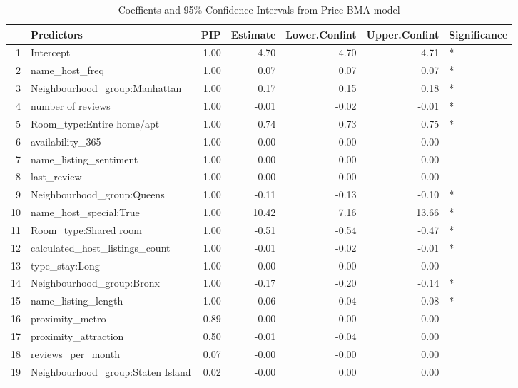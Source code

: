 \documentclass[10pt]{jmlr}%
\begin{document}
\begin{table}[ht]
\centering
\begin{tabular}{rlrrrrl}
  \hline
 & Predictors & PIP & Estimate & Lower.Confint & Upper.Confint & Significance \\ 
  \hline
1 & Intercept & 1.00 & 4.70 & 4.70 & 4.71 & * \\ 
  2 & name\_host\_freq & 1.00 & 0.07 & 0.07 & 0.07 & * \\ 
  3 & Neighbourhood\_group:Manhattan & 1.00 & 0.17 & 0.15 & 0.18 & * \\ 
  4 & number of reviews & 1.00 & -0.01 & -0.02 & -0.01 & * \\ 
  5 & Room\_type:Entire home/apt & 1.00 & 0.74 & 0.73 & 0.75 & * \\ 
  6 & availability\_365 & 1.00 & 0.00 & 0.00 & 0.00 &  \\ 
  7 & name\_listing\_sentiment & 1.00 & 0.00 & 0.00 & 0.00 &  \\ 
  8 & last\_review & 1.00 & -0.00 & -0.00 & -0.00 &  \\ 
  9 & Neighbourhood\_group:Queens & 1.00 & -0.11 & -0.13 & -0.10 & * \\ 
  10 & name\_host\_special:True & 1.00 & 10.42 & 7.16 & 13.66 & * \\ 
  11 & Room\_type:Shared room & 1.00 & -0.51 & -0.54 & -0.47 & * \\ 
  12 & calculated\_host\_listings\_count & 1.00 & -0.01 & -0.02 & -0.01 & * \\ 
  13 & type\_stay:Long & 1.00 & 0.00 & 0.00 & 0.00 &  \\ 
  14 & Neighbourhood\_group:Bronx & 1.00 & -0.17 & -0.20 & -0.14 & * \\ 
  15 & name\_listing\_length & 1.00 & 0.06 & 0.04 & 0.08 & * \\ 
  16 & proximity\_metro & 0.89 & -0.00 & -0.00 & 0.00 &  \\ 
  17 & proximity\_attraction & 0.50 & -0.01 & -0.04 & 0.00 &  \\ 
  18 & reviews\_per\_month & 0.07 & -0.00 & -0.00 & 0.00 &  \\ 
  19 & Neighbourhood\_group:Staten Island & 0.02 & -0.00 & 0.00 & 0.00 &  \\ 
   \hline
\end{tabular}
\caption{Coeffients and 95\% Confidence Intervals from Price BMA model} 
\end{table}


	

\newpage



\end{document}
